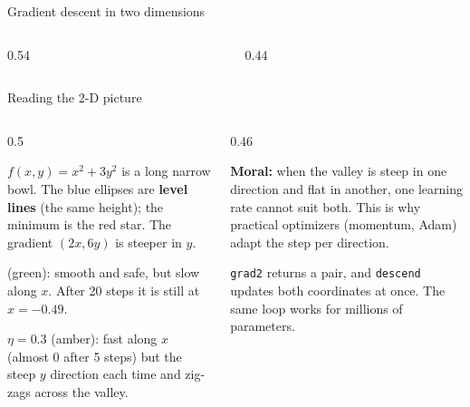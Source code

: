\documentclass[aspectratio=169,10pt]{beamer}
\begin{document}
\begin{frame}{Gradient descent in two dimensions}
\begin{columns}[T]
\begin{column}{0.54\textwidth}
\begin{sfig}[0.88]
\end{sfig}
\end{column}
\begin{column}{0.44\textwidth}
\pycode[\fontsize{7.4}{8.8}\selectfont]{gradient2d}
\end{column}
\end{columns}
\end{frame}

\begin{frame}{Reading the 2-D picture}
\begin{columns}[T]
\begin{column}{0.5\textwidth}
{\small
$f(x,y)=x^2+3y^2$ is a long narrow bowl. The blue ellipses are \textbf{level lines} (the same height); the minimum is the red star. The gradient $(2x,6y)$ is steeper in $y$.

\vspace{2mm}
 (green): smooth and safe, but slow along $x$. After 20 steps it is still at $x=-0.49$.

\vspace{2mm}
\textcolor{tdAmber!80!black}{\textbf{$\eta=0.3$}} (amber): fast along $x$ (almost 0 after 5 steps) but the steep $y$ direction  each time and zig-zags across the valley.}
\end{column}
\begin{column}{0.46\textwidth}
\vspace{2mm}
{\small
\textbf{Moral:} when the valley is steep in one direction and flat in another, one learning rate cannot suit both. This is why practical optimizers (momentum, Adam) adapt the step per direction.

\vspace{2mm}
\texttt{grad2} returns a pair, and \texttt{descend} updates both coordinates at once. The same loop works for millions of parameters.}
\end{column}
\end{columns}
\end{frame}
\end{document}
